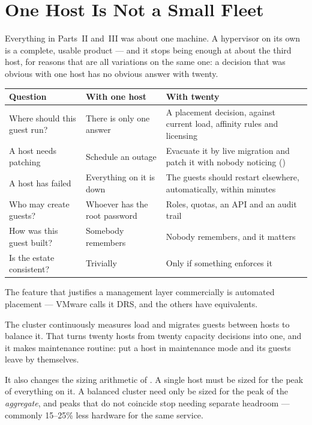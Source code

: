 \section{One Host Is Not a Small Fleet}

Everything in Parts~II and~III was about one machine. A hypervisor on its own
is a complete, usable product --- and it stops being enough at about the third
host, for reasons that are all variations on the same one: a decision that was
obvious with one host has no obvious answer with twenty.

\begin{longtable}{@{}L{4.7cm}L{4.6cm}L{5.1cm}@{}}
\toprule
{}
\textbf{Question} & \textbf{With one host} & \textbf{With twenty} \\
\midrule
\endhead
Where should this guest run? & There is only one answer & A placement decision,
against current load, affinity rules and licensing \\
A host needs patching & Schedule an outage & Evacuate it by live migration and
patch it with nobody noticing () \\
A host has failed & Everything on it is down & The guests should restart
elsewhere, automatically, within minutes \\
Who may create guests? & Whoever has the root password & Roles, quotas, an API
and an audit trail \\
How was this guest built? & Somebody remembers & Nobody remembers, and it
matters \\
Is the estate consistent? & Trivially & Only if something enforces it \\
\bottomrule
\end{longtable}

\begin{conceptbox}
The feature that justifies a management layer commercially is automated
placement --- VMware calls it DRS, and the others have equivalents.

\smallskip
The cluster continuously measures load and migrates guests between hosts to
balance it. That turns twenty hosts from twenty capacity decisions into one,
and it makes maintenance routine: put a host in maintenance mode and its guests
leave by themselves.

\smallskip
It also changes the sizing arithmetic of . A single host must be
sized for the peak of everything on it. A balanced cluster need only be sized
for the peak of the \emph{aggregate}, and peaks that do not coincide stop
needing separate headroom --- commonly 15--25\% less hardware for the same
service.
\end{conceptbox}


